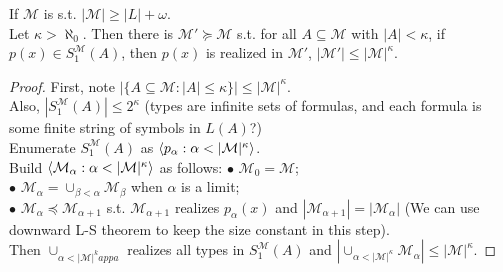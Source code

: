 \documentclass[a4paper]{article}
\begin{document}
\begin{lemma}
    If $\mathcal{M}$ is s.t. $|\mathcal{M}| \geq |L|+\omega$.\\
    Let $\kappa > \aleph_0$. Then there is $\mathcal{M}' \succcurlyeq \mathcal{M}$ s.t. for all $A \subseteq \mathcal{M}$ with $|A| < \kappa$, if $p(x) \in S_1^\mathcal{M}(A)$, then $p(x)$ is realized in $\mathcal{M}'$, $|\mathcal{M}'| \leq |\mathcal{M}|^\kappa$.
    \begin{proof}
        First, note $|\{A \subseteq \mathcal{M}: |A| \leq \kappa\}| \leq |\mathcal{M}|^\kappa$.\\
        Also, $|S_1^\mathcal{M}(A)| \leq 2^\kappa$ (types are infinite sets of formulas, and each formula is some finite string of symbols in $L(A)$?)\\
        Enumerate $S_1^\mathcal{M}(A)$ as $\bra p_\alpha:\alpha<|\mathcal{M}|^\kappa\ket$.\\
        Build $\bra \mathcal{M}_\alpha:\alpha<|\mathcal{M}|^\kappa\ket$ as follows:
        $\bullet$ $\mathcal{M}_0 = \mathcal{M}$;\\
        $\bullet$ $\mathcal{M}_\alpha =\cup_{\beta < \alpha} \mathcal{M}_\beta$ when $\alpha$ is a limit;\\
        $\bullet$ $\mathcal{M}_\alpha \preccurlyeq \mathcal{M}_{\alpha+1}$ s.t. $\mathcal{M}_{\alpha+1}$ realizes $p_\alpha(x)$ and $|\mathcal{M}_{\alpha+1}| = |\mathcal{M}_\alpha|$ (We can use downward L-S theorem to keep the size constant in this step).\\
        Then $\cup_{\alpha<|\mathcal{M}|^kappa}$ realizes all types in $S_1^\mathcal{M}(A)$ and $|\cup_{\alpha<|\mathcal{M}|^\kappa} \mathcal{M}_\alpha| \leq |\mathcal{M}|^\kappa$.
    \end{proof}
\end{lemma}
\end{document}
